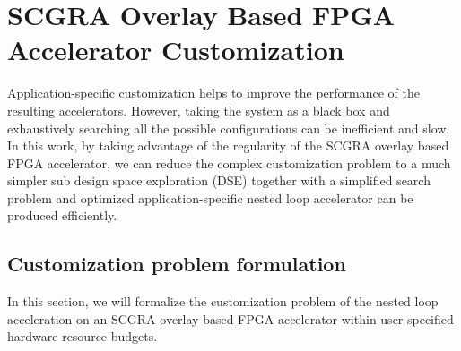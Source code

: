 \section{SCGRA Overlay Based FPGA Accelerator Customization} \label{sec:customization}
Application-specific customization helps to improve 
the performance of the resulting accelerators. However, 
taking the system as a black box and exhaustively searching all the 
possible configurations can be inefficient and slow. In this work, by taking advantage 
of the regularity of the SCGRA overlay based FPGA accelerator, we 
can reduce the complex customization problem to a much simpler sub design space exploration (DSE)
together with a simplified search problem and optimized application-specific 
nested loop accelerator can be produced efficiently.

\subsection{Customization problem formulation}
In this section, we will formalize the customization problem of the nested loop acceleration on an
SCGRA overlay based FPGA accelerator within user specified hardware resource budgets. 
